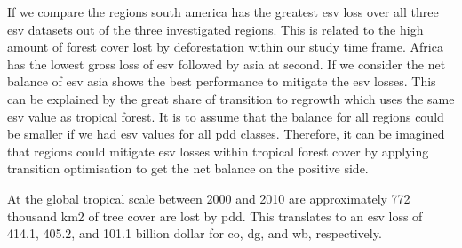 		 If we compare the regions south america has the greatest esv loss over all three esv datasets out of the three investigated regions. This is related to the high amount of forest cover lost by deforestation within our study time frame. Africa has the lowest gross loss of esv followed by asia at second. If we consider the net balance of esv asia shows the best performance to mitigate the esv losses. This can be explained by the great share of transition to regrowth which uses the same esv value as tropical forest. It is to assume that the balance for all regions could be smaller if we had esv values for all pdd classes. Therefore, it can be imagined that regions could mitigate esv losses within tropical forest cover by applying transition optimisation to get the net balance on the positive side.

		 At the global tropical scale between 2000 and 2010 are approximately 772 thousand km2 of tree cover are lost by pdd. This translates to an esv loss of 414.1, 405.2, and 101.1 billion dollar for co, dg, and wb, respectively. 



